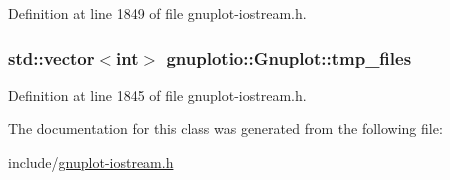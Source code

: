 Definition at line 1849 of file gnuplot-\/iostream.\+h.

\subsubsection[{\texorpdfstring{tmp\+\_\+files}{tmp_files}}]{\setlength{\rightskip}{0pt plus 5cm}std\+::vector$<$int$>$ gnuplotio\+::\+Gnuplot\+::tmp\+\_\+files}\hypertarget{classgnuplotio_1_1_gnuplot_a92a4f6322e486de17db4507a5fc77348}{}\label{classgnuplotio_1_1_gnuplot_a92a4f6322e486de17db4507a5fc77348}


Definition at line 1845 of file gnuplot-\/iostream.\+h.



The documentation for this class was generated from the following file\+:\begin{DoxyCompactItemize}
\item 
include/\hyperlink{gnuplot-iostream_8h}{gnuplot-\/iostream.\+h}\end{DoxyCompactItemize}
